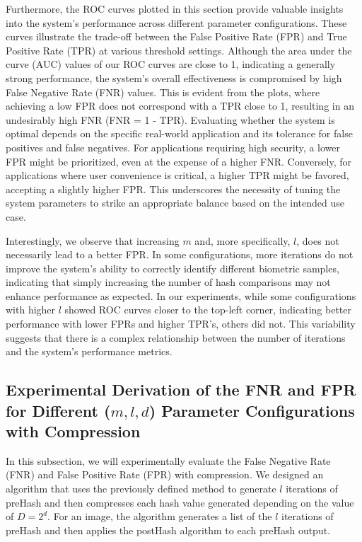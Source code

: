 Furthermore, the ROC curves plotted in this section provide valuable insights into the system's performance across different parameter configurations. These curves illustrate the trade-off between the False Positive Rate (FPR) and True Positive Rate (TPR) at various threshold settings. Although the area under the curve (AUC) values of our ROC curves are close to 1, indicating a generally strong performance, the system's overall effectiveness is compromised by high False Negative Rate (FNR) values. This is evident from the plots, where achieving a low FPR does not correspond with a TPR close to 1, resulting in an undesirably high FNR (FNR = 1 - TPR). Evaluating whether the system is optimal depends on the specific real-world application and its tolerance for false positives and false negatives. For applications requiring high security, a lower FPR might be prioritized, even at the expense of a higher FNR. Conversely, for applications where user convenience is critical, a higher TPR might be favored, accepting a slightly higher FPR. This underscores the necessity of tuning the system parameters to strike an appropriate balance based on the intended use case.

Interestingly, we observe that increasing \(m\) and, more specifically, \(l\), does not necessarily lead to a better FPR. In some configurations, more iterations do not improve the system's ability to correctly identify different biometric samples, indicating that simply increasing the number of hash comparisons may not enhance performance as expected. In our experiments, while some configurations with higher \(l\) showed ROC curves closer to the top-left corner, indicating better performance with lower FPRs and higher TPR's, others did not. This variability suggests that there is a complex relationship between the number of iterations and the system's performance metrics.

\subsection{Experimental Derivation of the FNR and FPR for Different (\(m, l, d\)) Parameter Configurations with Compression}

In this subsection, we will experimentally evaluate the False Negative Rate (FNR) and False Positive Rate (FPR) with compression. We designed an algorithm that uses the previously defined method to generate \( l \) iterations of preHash and then compresses each hash value generated depending on the value of \(D = 2^d\). For an image, the algorithm generates a list of the \( l \) iterations of preHash and then applies the postHash algorithm to each preHash output.

